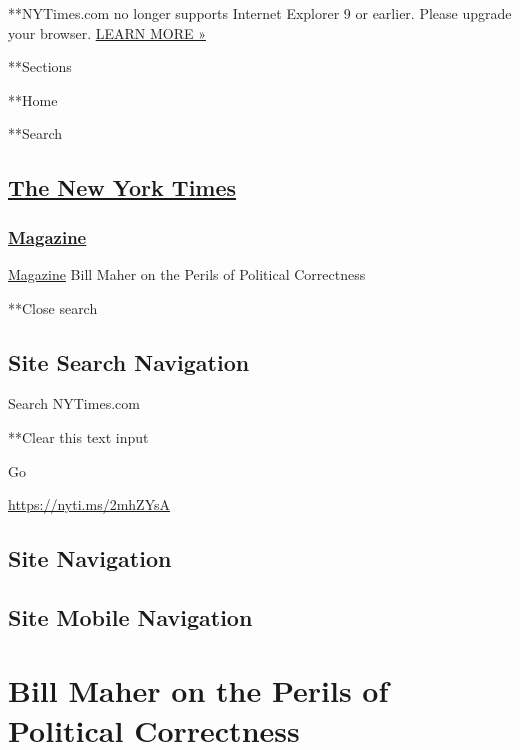  **NYTimes.com no longer supports Internet Explorer 9 or earlier. Please
upgrade your browser.
\href{http://www.nytimes3xbfgragh.onion/content/help/site/ie9-support.html}{LEARN
MORE »}

**Sections

**Home

**Search

\hypertarget{the-new-york-times}{%
\subsection{\texorpdfstring{\href{http://www.nytimes3xbfgragh.onion/}{The
New York Times}}{The New York Times}}\label{the-new-york-times}}

\hypertarget{-magazine-}{%
\subsubsection{\texorpdfstring{
\href{https://www.nytimes3xbfgragh.onion/section/magazine}{Magazine}
}{ Magazine }}\label{-magazine-}}

 \href{https://www.nytimes3xbfgragh.onion/section/magazine}{Magazine}
\textbar{}Bill Maher on the Perils of Political Correctness

**Close search

\hypertarget{site-search-navigation}{%
\subsection{Site Search Navigation}\label{site-search-navigation}}

Search NYTimes.com

**Clear this text input

Go

\url{https://nyti.ms/2mhZYsA}

\hypertarget{site-navigation}{%
\subsection{Site Navigation}\label{site-navigation}}

\hypertarget{site-mobile-navigation}{%
\subsection{Site Mobile Navigation}\label{site-mobile-navigation}}

\hypertarget{bill-maher-on-the-perils-of-political-correctness}{%
\section{Bill Maher on the Perils of Political
Correctness}\label{bill-maher-on-the-perils-of-political-correctness}}

